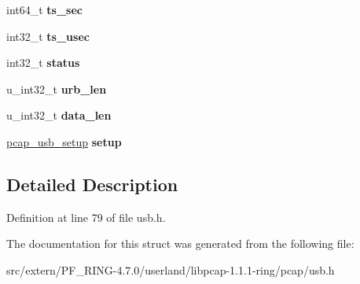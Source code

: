 \begin{DoxyCompactItemize}
\item 
\hypertarget{struct__usb__header_a09b431b42b45b1f4b7d4511813141daa}{
int64\_\-t {\bfseries ts\_\-sec}}
\label{struct__usb__header_a09b431b42b45b1f4b7d4511813141daa}

\item 
\hypertarget{struct__usb__header_aef77b2a16caf2ff3acdec1ffd4a71a25}{
int32\_\-t {\bfseries ts\_\-usec}}
\label{struct__usb__header_aef77b2a16caf2ff3acdec1ffd4a71a25}

\item 
\hypertarget{struct__usb__header_af5f67e8294fb486d0fc5bd85dc8e7cc8}{
int32\_\-t {\bfseries status}}
\label{struct__usb__header_af5f67e8294fb486d0fc5bd85dc8e7cc8}

\item 
\hypertarget{struct__usb__header_a7bddec081bc016e4f2dfaa7dacde3abc}{
u\_\-int32\_\-t {\bfseries urb\_\-len}}
\label{struct__usb__header_a7bddec081bc016e4f2dfaa7dacde3abc}

\item 
\hypertarget{struct__usb__header_ac69321f836c8e1d26a5831e2bfee4a27}{
u\_\-int32\_\-t {\bfseries data\_\-len}}
\label{struct__usb__header_ac69321f836c8e1d26a5831e2bfee4a27}

\item 
\hypertarget{struct__usb__header_a2080c81e5f6edfeb48a4eb6d21da8d83}{
\hyperlink{struct__usb__setup}{pcap\_\-usb\_\-setup} {\bfseries setup}}
\label{struct__usb__header_a2080c81e5f6edfeb48a4eb6d21da8d83}

\end{DoxyCompactItemize}


\subsection{Detailed Description}


Definition at line 79 of file usb.h.



The documentation for this struct was generated from the following file:\begin{DoxyCompactItemize}
\item 
src/extern/PF\_\-RING-\/4.7.0/userland/libpcap-\/1.1.1-\/ring/pcap/usb.h\end{DoxyCompactItemize}
